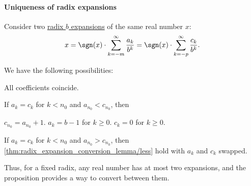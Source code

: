 \paragraph{Uniqueness of radix expansions}

\begin{lemma}\label{thm:radix_expansion_conversion_lemma}
  Consider two \hyperref[def:real_number_radix_expansion]{radix \( b \) expansions} of the same real number \( x \):
  \begin{equation*}
    x = \sgn(x) \cdot \sum_{k=-m}^\infty \frac {a_k} {b^k} = \sgn(x) \cdot \sum_{k=-p}^\infty \frac {c_k} {b^k}.
  \end{equation*}

  We have the following possibilities:
  \begin{thmenum}
     All coefficients coincide.

     If \( a_k = c_k \) for \( k < n_0 \) and \( a_{n_0} < c_{n_0} \), then
    \begin{thmenum}
       \( c_{n_0} = a_{n_0} + 1 \).
       \( a_k = b - 1 \) for \( k \geq 0 \).
       \( c_k = 0 \) for \( k \geq 0 \).
    \end{thmenum}

     If \( a_k = c_k \) for \( k < n_0 \) and \( a_{n_0} > c_{n_0} \), then \cref{thm:radix_expansion_conversion_lemma/less} hold with \( a_k \) and \( c_k \) swapped.
  \end{thmenum}
\end{lemma}
\begin{comments}
  \item Thus, for a fixed radix, any real number has at most two expansions, and the proposition provides a way to convert between them.
\end{comments}
